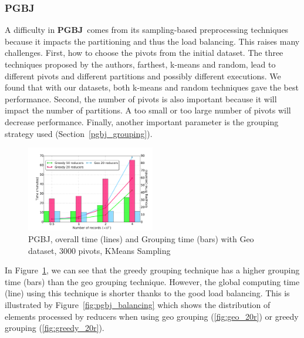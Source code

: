 \documentclass[10pt,journal,compsoc]{IEEEtran}
\newcommand{\VO}{{\bf PGBJ}}
\begin{document}
\subsubsection{PGBJ} 
A difficulty in \VO~comes from its sampling-based preprocessing techniques because it 
impacts the partitioning and thus the load balancing. This raises many challenges. First, how to choose
the pivots from the initial dataset. The three techniques proposed by the authors, farthest, k-means and 
random, lead to different pivots and different partitions and possibly different executions. We found that 
with  our datasets, both k-means and random techniques
gave the best performance. Second, the number of pivots is also important because
it will impact the number of partitions. A too small or too large number of pivots 
will decrease performance. Finally, another important parameter is the grouping strategy used 
(Section~\ref{pgbj_grouping}).
\begin{figure}[!h]
   \includegraphics[width=0.5\textwidth]{img-perf/perso/pgbj/strategy.pdf} 
   \caption{PGBJ, overall time (lines) and Grouping time (bars)\label{fig:pgbj_strategy} with Geo dataset, 3000 pivots, 
   KMeans Sampling}         
\end{figure}
In Figure~\ref{fig:pgbj_strategy}, we can see that the greedy grouping technique has a higher grouping time 
(bars) than the geo grouping technique. 
However, the global computing time (line) using this technique is shorter thanks to the good load balancing. This
is illustrated by Figure~\ref{fig:pgbj_balancing} which shows the distribution of elements processed
by reducers when using geo grouping (\ref{fig:geo_20r}) or greedy grouping (\ref{fig:greedy_20r}).
                  
\end{document}
